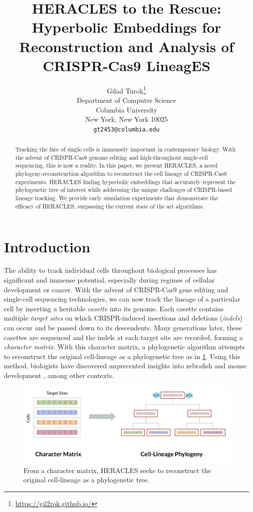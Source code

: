 \documentclass{article}
\title{HERACLES to the Rescue: Hyperbolic Embeddings for Reconstruction and Analysis of CRISPR-Cas9 LineagES}
\author{%
  Gilad Turok\thanks{\url{https://gil2rok.github.io/}} \\
  Department of Computer Science\\
  Columbia University\\
  New York, New York 10025 \\
  \texttt{gt2453@columbia.edu} \\
}
\begin{document}
\maketitle


\begin{abstract}
  Tracking the fate of single cells is immensely important in contemporary biology. With the advent of CRISPR-Cas9 genome editing and high-throughout single-cell sequencing, this is now a reality. In this paper, we present HERACLES, a novel phylogeny-reconstruction algorithm to reconstruct the cell lineage of CRISPR-Cas9  experiments. HERACLES finding hyperbolic embeddings that accurately represent the phylogenetic tree of interest while addressing the unique challenges of CRISPR-based lineage tracking. We provide early simulation experiments that demonstrate the efficacy of HERACLES, surpassing the current state of the art algorithms.
\end{abstract}


\section{Introduction}


The ability to track individual cells throughout biological processes has significant and immense potential, especially during regimes of cellular development or cancer. With the advent of CRISPR-Cas9 gene editing and single-cell sequencing technologies, we can now track the lineage of a particular cell by inserting a heritable \emph{casette} into its genome. Each casette contains multiple \emph{target sites} on which CRISPR-induced insertions and deletions (\emph{indels}) can occur and be passed down to its descendents. Many generations later, these casettes are sequenced and the indels at each target site are recorded, forming a \emph{character matrix}. With this character matrix, a phylogenetic algorithm attempts to reconstruct the original cell-lineage as a phylogenetic tree as in \ref{fig:problem_statement}. Using this method, biologists have discovered unprecented insights into zebrafish \cite{McKenna2016} \cite{Raj2018}  and mouse development \cite{Kalhor2018} \cite{chan2019}, among other contexts.

\begin{figure}[t]
  \label{fig:problem_statement}
  \includegraphics[width=\linewidth]{images/problem_statement.png}
  \caption{From a character matrix, HERACLES seeks to reconstruct the original cell-lineage as a phylogenetic tree.}
\end{figure}
\end{document}
